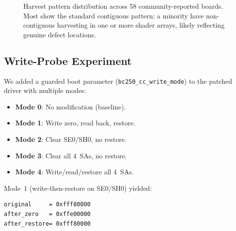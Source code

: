 \documentclass[11pt,twocolumn]{article}
\begin{document}
\begin{figure}[H]
\centering
{}
\caption{Harvest pattern distribution across 58 community-reported boards. Most show the standard contiguous pattern; a minority have non-contiguous harvesting in one or more shader arrays, likely reflecting genuine defect locations.}
\label{fig:harvest}
\end{figure}

\subsection{Write-Probe Experiment}

We added a guarded boot parameter (\texttt{bc250\_cc\_write\_mode}) to the patched driver with multiple modes:

\begin{itemize}[nosep]
    \item \textbf{Mode 0}: No modification (baseline).
    \item \textbf{Mode 1}: Write zero, read back, restore.
    \item \textbf{Mode 2}: Clear SE0/SH0, no restore.
    \item \textbf{Mode 3}: Clear all 4~SAs, no restore.
    \item \textbf{Mode 4}: Write/read/restore all 4~SAs.
\end{itemize}

Mode~1 (write-then-restore on SE0/SH0) yielded:

\begin{lstlisting}
original     = 0xfff80000
after_zero   = 0xffe00000
after_restore= 0xfff80000
\end{lstlisting}
\end{document}
